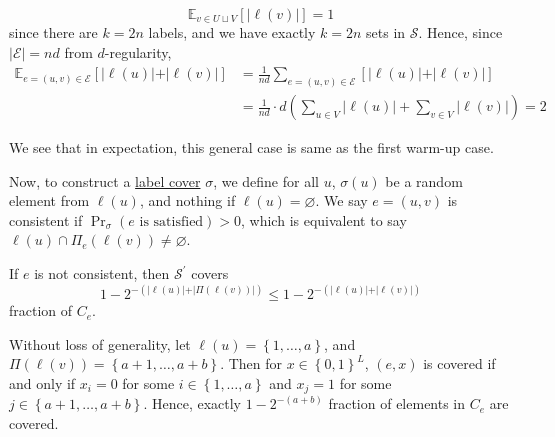 \begin{enumerate}[(a)]
	      \[
		      \mathbb{E}_{v\in U \sqcup V}\left[ \vert \ell (v) \vert \right] = 1
	      \]
	      since there are \(k=2n\) labels, and we have exactly \(k=2n\) sets in \(\mathcal{S} \). Hence, since \(\vert \mathcal{E}  \vert = nd \) from \(d\)-regularity,
	      \[
		      \begin{split}
			      \mathbb{E}_{e=(u, v)\in \mathcal{E} }\left[ \vert \ell (u) \vert + \vert \ell (v) \vert \right]
			      &= \frac{1}{nd} \sum_{e=(u, v)\in \mathcal{E} } \left[ \vert \ell (u) \vert + \vert \ell (v) \vert  \right]\\
			      &= \frac{1}{nd}\cdot d \left( \sum_{u\in V} \vert \ell (u) \vert + \sum_{v\in V} \vert \ell (v) \vert \right)
			      = 2
		      \end{split}
	      \]
	      \begin{intuition}
		      We see that in expectation, this general case is same as the first warm-up case.
	      \end{intuition}
	      Now, to construct a \hyperref[prb:label-cover]{label cover} \(\sigma \), we define for all \(u\), \(\sigma (u)\) be a random element from \(\ell (u)\), and nothing if \(\ell (u) = \varnothing \). We say \(e=(u, v)\) is consistent if \(\Pr_{\sigma }(e \text{ is satisfied} ) > 0\), which is equivalent to say \(\ell (u) \cap \Pi _e(\ell (v)) \neq \varnothing \).
	      \begin{claim}
		      If \(e\) is not consistent, then \(\mathcal{S} ^\prime \) covers
		      \[
			      1 - 2^{- (\vert \ell (u) \vert + \vert \Pi (\ell (v)) \vert )} \leq 1 - 2^{- (\vert \ell (u) \vert + \vert \ell (v) \vert )}
		      \]
		      fraction of \(C_e\).
	      \end{claim}
	      \begin{explanation}
		      Without loss of generality, let \(\ell (u) = \left\{ 1, \dots , a  \right\} \), and \(\Pi (\ell (v)) = \left\{ a+1, \dots , a+b \right\} \). Then for \(x\in \left\{ 0, 1 \right\} ^L\), \((e, x)\) is covered if and only if \(x_i = 0\) for some \(i\in \left\{ 1, \dots , a  \right\} \) and \(x_j = 1\) for some \(j\in \left\{ a+1, \dots , a+b  \right\} \). Hence, exactly \(1-2^{-(a+b)}\) fraction of elements in \(C_e\) are covered.
	      \end{explanation}


\end{enumerate}

